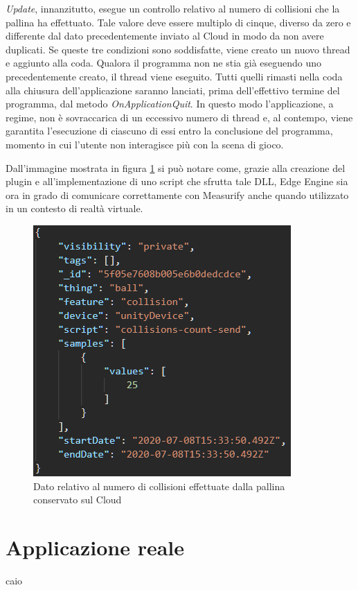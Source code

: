 \textit{Update}, innanzitutto, esegue un controllo relativo al numero di collisioni che la pallina ha effettuato. Tale valore deve essere multiplo di cinque, diverso da zero e differente dal dato precedentemente inviato al Cloud in modo da non avere duplicati. Se queste tre condizioni sono soddisfatte, viene creato un nuovo thread e aggiunto alla coda. Qualora il programma non ne stia già eseguendo uno precedentemente creato, il thread viene eseguito. Tutti quelli rimasti nella coda alla chiusura dell'applicazione saranno lanciati, prima dell'effettivo termine del programma, dal metodo \textit{OnApplicationQuit}. In questo modo l'applicazione, a regime, non è sovraccarica di un eccessivo numero di thread e, al contempo, viene garantita l'esecuzione di ciascuno di essi entro la conclusione del programma, momento in cui l'utente non interagisce più con la scena di gioco.

Dall'immagine mostrata in figura \ref{risorsaunity} si può notare come, grazie alla creazione del plugin e all'implementazione di uno script che sfrutta tale DLL, Edge Engine sia ora in grado di comunicare correttamente con Measurify anche quando utilizzato in un contesto di realtà virtuale.

\begin{figure}[H]
	\centering
	\includegraphics[scale=0.7]{pics/measunity}
	\caption{Dato relativo al numero di collisioni effettuate dalla pallina conservato sul Cloud}
	\label{risorsaunity}
\end{figure}

\section{Applicazione reale}
caio

